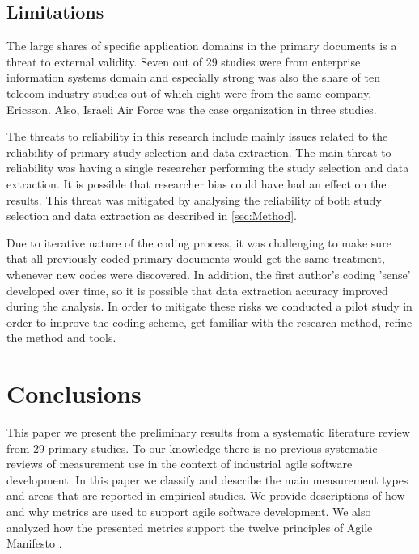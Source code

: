 \documentclass{sig-alternate}
\newcommand{\juha}[1]{\ignorespaces}
\begin{document}
\subsection{Limitations}\juha{muokkasin t�t�, tuli ehk� v�h�n pitk�, Mika saatko tiivistetty� }
The large shares of specific application domains in the primary documents is a
threat to external validity. Seven out of 29 studies were from enterprise
information systems domain and especially strong was also the share of ten
telecom industry studies out of which eight were from the same company,
Ericsson. Also, Israeli Air Force was the case organization in three studies.

The threats to reliability in this research include mainly issues related to
the reliability of primary study selection and data extraction. The main
threat to reliability was having a single researcher performing the study
selection and data extraction. It is possible that researcher bias could have
had an effect on the results. This threat was mitigated by analysing the
reliability of both study selection and data extraction as described in
\cref{sec:Method}.


Due to iterative nature of the coding process, it was challenging to make sure
that all previously coded primary documents would get the same treatment,
whenever new codes were discovered. In addition, the first author's coding
'sense' developed over time, so it is possible that data extraction accuracy
improved during the analysis. In order to mitigate these risks we conducted a
pilot study in order to improve the coding scheme, get familiar with the
research method, refine the method and tools.



\section{Conclusions}%
\label{sec:Conclusions}

This paper we present the preliminary results from a systematic literature
review from 29 primary studies. To our knowledge there is no previous
systematic reviews of  measurement use in the context of industrial agile
software development. In this paper we classify and describe the main
measurement types and areas that are reported in empirical  studies. We
provide descriptions of how and why metrics are used to support agile software
development. We also analyzed how the presented metrics support the twelve
principles of Agile Manifesto \cite{beck2001agile}.
\end{document}
